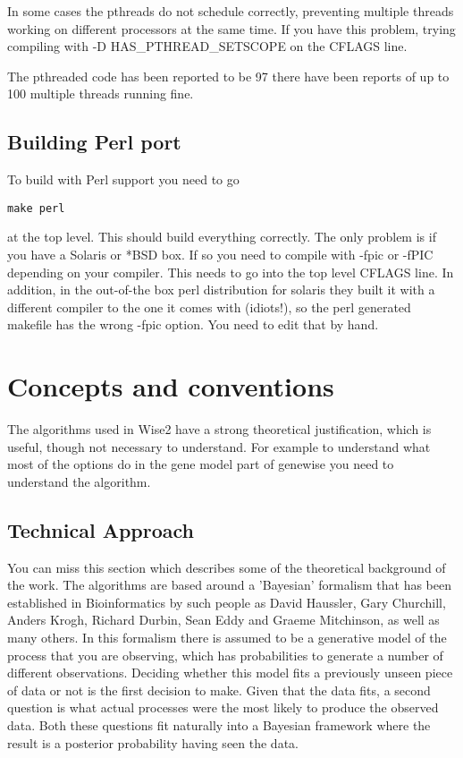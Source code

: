\documentclass{article}
\begin{document}
In some cases the pthreads do not schedule correctly, preventing multiple
threads working on different processors at the same time. If you have
this problem, trying compiling with -D HAS\_PTHREAD\_SETSCOPE on the CFLAGS
line.

The pthreaded code has been reported to be 97%
there have been reports of up to 100 multiple threads running fine.

\subsection{Building Perl port}
\label{perl_port}

To build with Perl support you need to go 
\begin{verbatim}
make perl
\end{verbatim}
at the top level. This should build everything correctly. The only
problem is if you have a Solaris or *BSD box. If so you need to compile
with -fpic or -fPIC depending on your compiler. This needs to go into
the top level CFLAGS line. In addition, in the out-of-the box perl distribution
for solaris they built it with a different compiler to the one it comes
with (idiots!), so the perl generated makefile has the wrong -fpic option.
You need to edit that by hand.

\newpage
\section{Concepts and conventions}

The algorithms used in Wise2 have a strong theoretical justification,
which is useful, though not necessary to understand.  For example to
understand what most of the options do in the gene model part of
genewise you need to understand the algorithm.

\subsection{Technical Approach}

You can miss this section which describes some of the theoretical
background of the work.  The algorithms are based around a 'Bayesian'
formalism that has been established in Bioinformatics by such people
as David Haussler, Gary Churchill, Anders Krogh, Richard Durbin, Sean
Eddy and Graeme Mitchinson, as well as many others. In this formalism
there is assumed to be a generative model of the process that you are
observing, which has probabilities to generate a number of different
observations. Deciding whether this model fits a previously unseen
piece of data or not is the first decision to make. Given that the
data fits, a second question is what actual processes were the most
likely to produce the observed data. Both these questions fit
naturally into a Bayesian framework where the result is a posterior
probability having seen the data.
\end{document}
